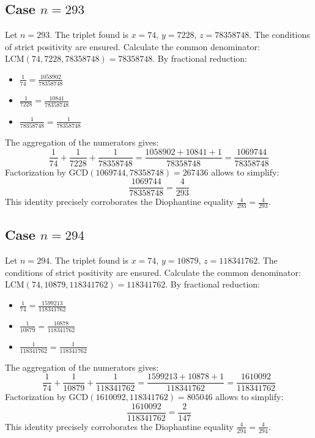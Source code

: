 \documentclass[11pt,a4paper]{article}
\begin{document}
\subsection{Case $n = 293$}
Let $n = 293$. The triplet found is $x = 74$, $y = 7228$, $z = 78358748$.
The conditions of strict positivity are ensured.
Calculate the common denominator: $\text{LCM}(74, 7228, 78358748) = 78358748$.
By fractional reduction:
\begin{itemize}
    \item $\frac{1}{74} = \frac{1058902}{78358748}$
    \item $\frac{1}{7228} = \frac{10841}{78358748}$
    \item $\frac{1}{78358748} = \frac{1}{78358748}$
\end{itemize}
The aggregation of the numerators gives:
$$ \frac{1}{74} + \frac{1}{7228} + \frac{1}{78358748} = \frac{1058902 + 10841 + 1}{78358748} = \frac{1069744}{78358748} $$
Factorization by $\text{GCD}(1069744, 78358748) = 267436$ allows to simplify:
$$ \frac{1069744}{78358748} = \frac{4}{293} $$
This identity precisely corroborates the Diophantine equality $\frac{4}{293} = \frac{4}{293}$.

\subsection{Case $n = 294$}
Let $n = 294$. The triplet found is $x = 74$, $y = 10879$, $z = 118341762$.
The conditions of strict positivity are ensured.
Calculate the common denominator: $\text{LCM}(74, 10879, 118341762) = 118341762$.
By fractional reduction:
\begin{itemize}
    \item $\frac{1}{74} = \frac{1599213}{118341762}$
    \item $\frac{1}{10879} = \frac{10878}{118341762}$
    \item $\frac{1}{118341762} = \frac{1}{118341762}$
\end{itemize}
The aggregation of the numerators gives:
$$ \frac{1}{74} + \frac{1}{10879} + \frac{1}{118341762} = \frac{1599213 + 10878 + 1}{118341762} = \frac{1610092}{118341762} $$
Factorization by $\text{GCD}(1610092, 118341762) = 805046$ allows to simplify:
$$ \frac{1610092}{118341762} = \frac{2}{147} $$
This identity precisely corroborates the Diophantine equality $\frac{4}{294} = \frac{4}{294}$.
\end{document}
